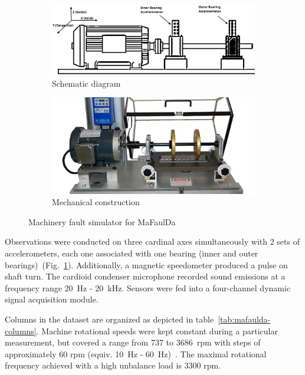 \begin{figure}[h]
\centering
\begin{subfigure}[b]{0.48\textwidth}
	\includegraphics[width=\textwidth]{assets/analysis/mafaulda-simulator.png}
	\caption{Schematic diagram \cite{pestana-viana_influence_2016}}
\end{subfigure}
\hfill
\begin{subfigure}[b]{0.48\textwidth}
	\includegraphics[width=\textwidth]{assets/analysis/machinery-fault-simulator.jpg}
	\caption{Mechanical construction \cite{noauthor_spectraquest_nodate}}
\end{subfigure}
\caption{Machinery fault simulator for MaFaulDa}
\label{fig:mafaulda-simulator}
\end{figure}

Observations were conducted on three cardinal axes simultaneously with 2 sets of accelerometers, each one associated with one bearing (inner and outer bearings)~(Fig.~\ref{fig:mafaulda-simulator}). Additionally, a magnetic speedometer produced a pulse on shaft turn. The cardioid condenser microphone recorded sound emissions at a frequency range 20~Hz - 20~kHz. Sensors were fed into a four-channel dynamic signal acquisition module. 

Columns in the dataset are organized as depicted in table~\ref{tab:mafaulda-columns}. Machine rotational speeds were kept constant during a particular measurement, but covered a range from 737 to 3686~rpm with steps of approximately 60 rpm (equiv. 10~Hz - 60~Hz)~\cite{pestana-viana_influence_2016}. The maximal rotational frequency achieved with a high unbalance load is 3300 rpm.

